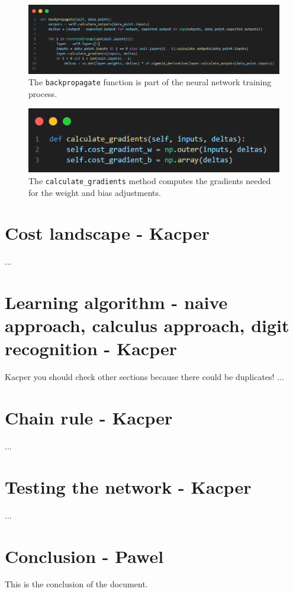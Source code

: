 \documentclass{article}
\begin{document}
\begin{figure}[ht]
    \centering 
    \includegraphics[width=1\textwidth]{images/backpropagate.png}
    \caption{The \texttt{backpropagate} function is part of the neural network training process.}
    \label{fig:backpropagation}
\end{figure}

\begin{figure}[ht]
    \centering 
    \includegraphics[width=1\textwidth]{images/calculate-gradients.png}
    \caption{The \texttt{calculate\_gradients} method computes the gradients needed for the weight and bias adjustments.}
    \label{fig:calculate_gradients}
\end{figure}

\newpage
\section{Cost landscape - Kacper}
...

\newpage
\section{Learning algorithm - naive approach, calculus approach, digit recognition - Kacper}
Kacper you should check other sections because there could be duplicates!
...

\newpage
\section{Chain rule - Kacper}
...

\newpage
\section{Testing the network - Kacper}
...

\newpage
\section{Conclusion - Pawel}
This is the conclusion of the document.
\end{document}
